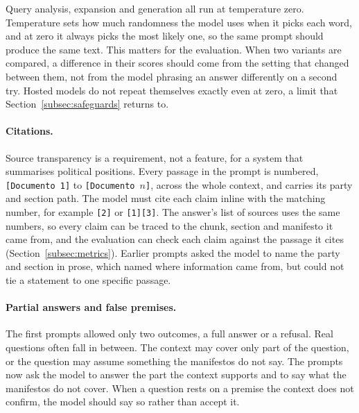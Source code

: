 Query analysis, expansion and generation all run at temperature zero.
Temperature sets how much randomness the model uses when it picks each word,
and at zero it always picks the most likely one, so the same prompt should
produce the same text. This matters for the evaluation. When two variants are
compared, a difference in their scores should come from the setting that
changed between them, not from the model phrasing an answer differently on a
second try. Hosted models do not repeat themselves exactly even at zero, a
limit that Section~\ref{subsec:safeguards} returns to.

\paragraph{Citations.} \label{subsec:citations}
Source transparency is a requirement, not a feature, for a system that
summarises political positions. Every passage in the prompt is numbered,
\texttt{[Documento 1]} to \texttt{[Documento $n$]}, across the whole context,
and carries its party and section path. The model must cite each claim inline
with the matching number, for example \texttt{[2]} or \texttt{[1][3]}. The
answer's list of sources uses the same numbers, so every claim can be traced
to the chunk, section and manifesto it came from, and the evaluation can check
each claim against the passage it cites (Section~\ref{subsec:metrics}). Earlier
prompts asked the model to name the party and section in prose, which named
where information came from, but could not tie a statement to one
specific passage.

\paragraph{Partial answers and false premises.} The first prompts allowed only
two outcomes, a full answer or a refusal. Real questions often fall in
between. The context may cover only part of the question, or the question may
assume something the manifestos do not say. The prompts now ask the model to
answer the part the context supports and to say what the manifestos do not
cover. When a question rests on a premise the context does not confirm, the
model should say so rather than accept it.

